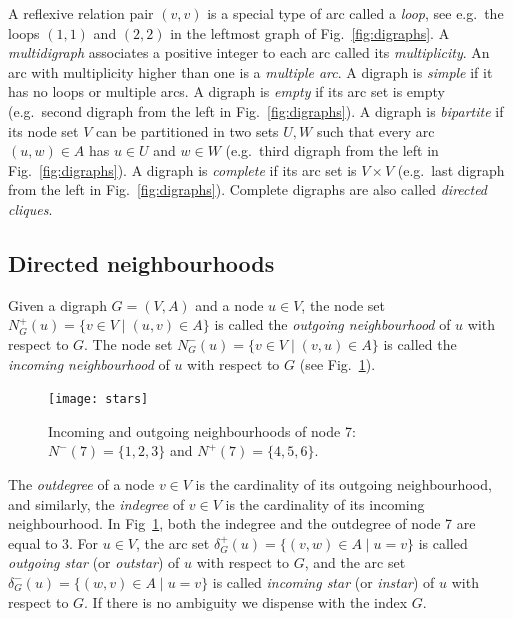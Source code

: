 \documentclass[a4paper]{book}
\theoremstyle{changebreak}                %
\begin{document}
A reflexive relation pair $(v,v)$ is a special type of arc called a
{\it loop}, see e.g.~the loops $(1,1)$ and $(2,2)$ in the
leftmost graph of Fig.~\ref{fig:digraphs}. A {\it
  multidigraph} associates a positive integer to
each arc called its {\it multiplicity}. An arc
with multiplicity higher than one is a {\it multiple
  arc}. A digraph is {\it
  simple} if it has no loops or multiple arcs.
A digraph is {\it empty} if its arc set is empty
(e.g.~second digraph from the left in Fig.~\ref{fig:digraphs}).  A
digraph is {\it bipartite}
if its node set $V$ can be partitioned in two sets $U,W$ such that
every arc $(u,w)\in A$ has $u\in U$ and $w\in W$ (e.g.~third digraph
from the left in Fig.~\ref{fig:digraphs}). A digraph is {\it
  complete} if its arc set is
$V\times V$ (e.g.~last digraph from the left in
Fig.~\ref{fig:digraphs}). Complete digraphs are also called {\it
  directed cliques}.

\subsection{Directed neighbourhoods}
Given a digraph $G=(V,A)$ and a node $u\in V$, the node set
$N^+_G(u)=\{v\in V\;|\;(u,v)\in A\}$ is called the \textit{outgoing
  neighbourhood} of $u$ with respect to
$G$. The node set $N^-_G(u)=\{v\in V\;|\;(v,u)\in A\}$ is called the
\textit{incoming neighbourhood} of $u$ with
respect to $G$ (see Fig.~\ref{fig:star}).
\begin{figure}[!ht]
\begin{center}
\texttt{[image: stars]}
\end{center}
\caption{Incoming and outgoing neighbourhoods of node 7:
  $N^-(7)=\{1,2,3\}$ and $N^+(7)=\{4,5,6\}$.}
\label{fig:star}
\end{figure}
The \textit{outdegree} of a node $v\in V$ is the
cardinality of its outgoing neighbourhood, and similarly, the
\textit{indegree} of $v\in V$ is the cardinality of
its incoming neighbourhood. In Fig~\ref{fig:star}, both the indegree
and the outdegree of node 7 are equal to 3. For $u\in V$, the arc set
$\delta^+_G(u)=\{(v,w)\in A\;|\;u=v\}$ is called {\it outgoing
  star} (or {\it outstar}) of $u$
with respect to $G$, and the arc set $\delta^-_G(u)=\{(w,v)\in
A\;|\;u=v\}$ is called {\it incoming star} (or
{\it instar}) of $u$ with respect to $G$. If there is no
ambiguity we dispense with the index $G$.
\end{document}
